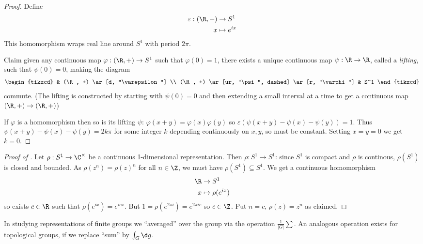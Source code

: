 \documentclass[a4paper]{article}
\theoremstyle{definition}
\begin{document}
\begin{proof}
  Define
  \begin{align*}
    \varepsilon: (\R, +) &\to S^1 \\
    x &\mapsto e^{ix}
  \end{align*}
  This homomorphism wraps real line around \(S^1\) with period \(2\pi\).

  Claim given any continuous map \(\varphi: (\R, +) \to S^1\) such that \(\varphi(0) = 1\), there exists a unique continuous map \(\psi: \R \to \R\), called a \emph{lifting}, such that \(\psi(0) = 0\), making the diagram
  \[
    \begin{tikzcd}
      & (\R, +) \ar[d, "\varepsilon"] \\
      (\R, +) \ar[ur, "\psi", dashed] \ar[r, "\varphi"] & S^1
    \end{tikzcd}
  \]
  commute. (The lifting is constructed by starting with \(\psi(0) = 0\) and then extending a small interval at a time to get a continuous map \((\R, +) \to (\R, +)\))

  If \(\varphi\) is a homomorphism then so is its lifting \(\psi\): \(\varphi(x + y) = \varphi(x) \varphi(y)\) so \(\varepsilon(\psi(x + y) - \psi(x) - \psi(y)) = 1\). Thus \(\psi(x + y) - \psi(x) - \psi(y) = 2k\pi\) for some integer \(k\) depending continuously on \(x, y\), so must be constant. Setting \(x = y = 0\) we get \(k = 0\).
\end{proof}

\begin{proof}[Proof of ]
  Let \(\rho: S^1 \to \C^\times\) be a continuous 1-dimensional representation. Then \(\rho: S^1 \to S^1\): since \(S^1\) is compact and \(\rho\) is continous, \(\rho(S^1)\) is closed and bounded. As \(\rho(z^n) = \rho(z)^n\) for all \(n \in \Z\), we must have \(\rho(S^1) \subseteq S^1\). We get a continuous homomorphism
  \begin{align*}
    \R &\to S^1 \\
    x &\mapsto \rho(e^{ix})
  \end{align*}
  so exists \(c \in \R\) such that \(\rho(e^{ix}) = e^{icx}\). But \(1 = \rho(e^{2\pi i}) = e^{2\pi ic}\) so \(c \in \Z\). Put \(n = c\), \(\rho(z) = z^n\) as claimed.
\end{proof}

In studying representations of finite groups we ``averaged'' over the group via the operation \(\frac{1}{|G|} \sum\). An analogous operation exists for topological groups, if we replace ``sum'' by \(\int_G \d g\).
\end{document}
